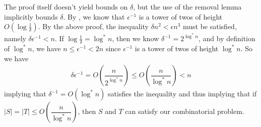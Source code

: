 The proof itself doesn't yield bounds on $\delta$, but the use of the removal lemma implicitly bounds $\delta$. By \cite{Fox11}, we know that $\epsilon^{-1}$ is a tower of twos of height $O\left(\log \frac{1}{\delta}\right)$. By the above proof, the inequality $\delta n^2 < \epsilon n^3$ must be satisfied, namely $\delta \epsilon^{-1} < n$. If $\log \frac{1}{\delta} = \log^* n$, then we know $\delta^{-1} = 2^{\log^* n}$, and by definition of $\log^* n$, we have $n \leq \epsilon^{-1} < 2n$ since $\epsilon^{-1}$ is a tower of twos of height $\log^* n$. So we have
\begin{align*}
	\delta \epsilon^{-1} = O\left(\dfrac{n}{2^{\log^* n}}\right) \leq O\left(\dfrac{n}{\log^* n}\right) < n
\end{align*}
implying that $\delta^{-1} = O(\log^* n)$ satisfies the inequality and thus implying that if $|S|=|T| \leq O\left(\dfrac{n}{\log^* n}\right)$, then $S$ and $T$ can satisfy our combinatorial problem.